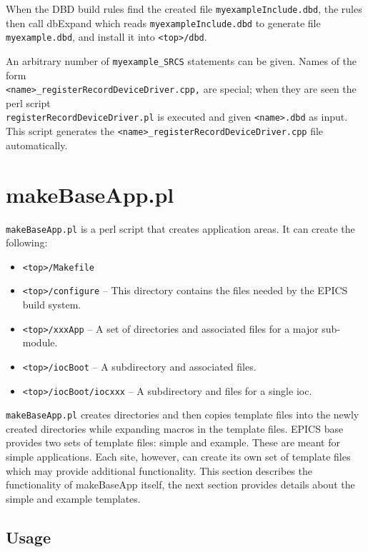 When the DBD build rules find the created file \verb|myexampleInclude.dbd|, the rules then call dbExpand which reads 
\verb|myexampleInclude.dbd| to generate file \verb|myexample.dbd|, and install it into \verb|<top>/dbd|.

An arbitrary number of \verb|myexample_SRCS| statements can be given. Names of the form \\
\verb|<name>_registerRecordDeviceDriver.cpp,| are special; when they are seen the perl script \\
\verb|registerRecordDeviceDriver.pl| is executed and given \verb|<name>.dbd| as input.  This script generates the
\verb|<name>_registerRecordDeviceDriver.cpp| file automatically.

\section{makeBaseApp.pl}

\verb|makeBaseApp.pl| is a perl script that creates application areas. It can create the following:

\begin{itemize}
\item \verb|<top>/Makefile|
\item \verb|<top>/configure| -- This directory contains the files needed by the EPICS build system.
\item \verb|<top>/xxxApp| -- A set of directories and associated files for a  major sub-module.
\item \verb|<top>/iocBoot| -- A subdirectory and associated files.
\item \verb|<top>/iocBoot/iocxxx| -- A subdirectory and files for a single ioc.
\end{itemize}

\verb|makeBaseApp.pl| creates directories and then copies template files into the newly created directories while expanding macros in the template files.
EPICS base provides two sets of template files: simple and example.
These are meant for simple applications.
Each site, however, can create its own set of template files which may provide additional functionality.
This section describes the functionality of makeBaseApp itself, the next section provides details about the simple and example templates.

\subsection{Usage}

